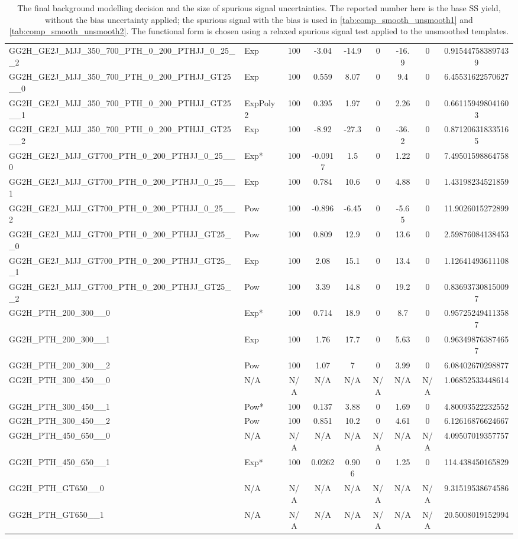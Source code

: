\begin{table}[!h]
{\begin{tabular}{llccccccS[table-format = 3.2, round-mode = places, round-precision = 2]}
 GG2H\_GE2J\_MJJ\_350\_700\_PTH\_0\_200\_PTHJJ\_0\_25\_\_2 & Exp &100&-3.04&-14.9&0&-16.9&0&0.915447583897439\\
 GG2H\_GE2J\_MJJ\_350\_700\_PTH\_0\_200\_PTHJJ\_GT25\_\_0 & Exp &100&0.559&8.07&0&9.4&0&6.45531622570627\\
 GG2H\_GE2J\_MJJ\_350\_700\_PTH\_0\_200\_PTHJJ\_GT25\_\_1 & ExpPoly2 &100&0.395&1.97&0&2.26&0&0.661159498041603\\
 GG2H\_GE2J\_MJJ\_350\_700\_PTH\_0\_200\_PTHJJ\_GT25\_\_2 & Exp &100&-8.92&-27.3&0&-36.2&0&0.871206318335165\\
 GG2H\_GE2J\_MJJ\_GT700\_PTH\_0\_200\_PTHJJ\_0\_25\_\_0 & Exp* &100&-0.0917&1.5&0&1.22&0&7.49501598864758\\
 GG2H\_GE2J\_MJJ\_GT700\_PTH\_0\_200\_PTHJJ\_0\_25\_\_1 & Exp &100&0.784&10.6&0&4.88&0&1.43198234521859\\
 GG2H\_GE2J\_MJJ\_GT700\_PTH\_0\_200\_PTHJJ\_0\_25\_\_2 & Pow &100&-0.896&-6.45&0&-5.65&0&11.9026015272899\\
 GG2H\_GE2J\_MJJ\_GT700\_PTH\_0\_200\_PTHJJ\_GT25\_\_0 & Pow &100&0.809&12.9&0&13.6&0&2.59876084138453\\
 GG2H\_GE2J\_MJJ\_GT700\_PTH\_0\_200\_PTHJJ\_GT25\_\_1 & Exp &100&2.08&15.1&0&13.4&0&1.12641493611108\\
 GG2H\_GE2J\_MJJ\_GT700\_PTH\_0\_200\_PTHJJ\_GT25\_\_2 & Pow &100&3.39&14.8&0&19.2&0&0.836937308150097\\
 GG2H\_PTH\_200\_300\_\_0 & Exp* &100&0.714&18.9&0&8.7&0&0.957252494113587\\
 GG2H\_PTH\_200\_300\_\_1 & Exp &100&1.76&17.7&0&5.63&0&0.963498763874657\\
 GG2H\_PTH\_200\_300\_\_2 & Pow &100&1.07&7&0&3.99&0&6.08402670298877\\
 GG2H\_PTH\_300\_450\_\_0 &N/A&N/A&N/A&N/A&N/A&N/A&N/A&1.06852533448614\\
 GG2H\_PTH\_300\_450\_\_1 &Pow*&100&0.137&3.88&0&1.69&0&4.80093522232552\\
 GG2H\_PTH\_300\_450\_\_2 & Pow &100&0.851&10.2&0&4.61&0&6.12616876624667\\
 GG2H\_PTH\_450\_650\_\_0 &N/A&N/A&N/A&N/A&N/A&N/A&N/A&4.09507019357757\\
 GG2H\_PTH\_450\_650\_\_1 & Exp* &100&0.0262&0.906&0&1.25&0&114.438450165829\\
 GG2H\_PTH\_GT650\_\_0 &N/A&N/A&N/A&N/A&N/A&N/A&N/A&9.31519538674586\\
 GG2H\_PTH\_GT650\_\_1 &N/A&N/A&N/A&N/A&N/A&N/A&N/A&20.5008019152994\\
    \hline
      \hline
      \end{tabular}
}
      \caption{
The final background modelling decision and the size of spurious signal uncertainties. The reported number here is the base SS yield, without the bias uncertainty applied; the spurious signal with the bias is used in \ref{tab:comp_smooth_unsmooth1} and \ref{tab:comp_smooth_unsmooth2}. The functional form is chosen using a relaxed spurious signal test applied to the unsmoothed templates. \label{tab:spurious_sig_gp} }
\end{table}


